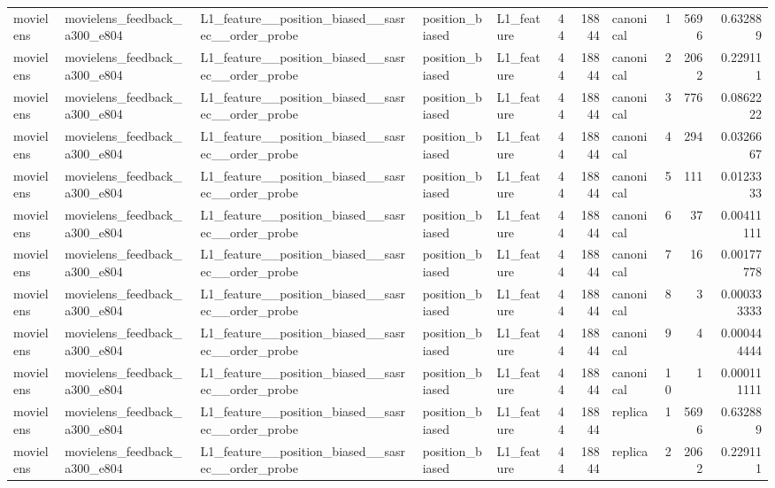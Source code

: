 \begin{table}[htbp!]
\begin{tabular}{lllllrrlrrr}
movielens & movielens\_feedback\_a300\_e804 & L1\_feature\_\_position\_biased\_\_sasrec\_\_order\_probe & position\_biased & L1\_feature & 44 & 18844 & canonical & 1 & 5696 & 0.632889 \\
movielens & movielens\_feedback\_a300\_e804 & L1\_feature\_\_position\_biased\_\_sasrec\_\_order\_probe & position\_biased & L1\_feature & 44 & 18844 & canonical & 2 & 2062 & 0.229111 \\
movielens & movielens\_feedback\_a300\_e804 & L1\_feature\_\_position\_biased\_\_sasrec\_\_order\_probe & position\_biased & L1\_feature & 44 & 18844 & canonical & 3 & 776 & 0.0862222 \\
movielens & movielens\_feedback\_a300\_e804 & L1\_feature\_\_position\_biased\_\_sasrec\_\_order\_probe & position\_biased & L1\_feature & 44 & 18844 & canonical & 4 & 294 & 0.0326667 \\
movielens & movielens\_feedback\_a300\_e804 & L1\_feature\_\_position\_biased\_\_sasrec\_\_order\_probe & position\_biased & L1\_feature & 44 & 18844 & canonical & 5 & 111 & 0.0123333 \\
movielens & movielens\_feedback\_a300\_e804 & L1\_feature\_\_position\_biased\_\_sasrec\_\_order\_probe & position\_biased & L1\_feature & 44 & 18844 & canonical & 6 & 37 & 0.00411111 \\
movielens & movielens\_feedback\_a300\_e804 & L1\_feature\_\_position\_biased\_\_sasrec\_\_order\_probe & position\_biased & L1\_feature & 44 & 18844 & canonical & 7 & 16 & 0.00177778 \\
movielens & movielens\_feedback\_a300\_e804 & L1\_feature\_\_position\_biased\_\_sasrec\_\_order\_probe & position\_biased & L1\_feature & 44 & 18844 & canonical & 8 & 3 & 0.000333333 \\
movielens & movielens\_feedback\_a300\_e804 & L1\_feature\_\_position\_biased\_\_sasrec\_\_order\_probe & position\_biased & L1\_feature & 44 & 18844 & canonical & 9 & 4 & 0.000444444 \\
movielens & movielens\_feedback\_a300\_e804 & L1\_feature\_\_position\_biased\_\_sasrec\_\_order\_probe & position\_biased & L1\_feature & 44 & 18844 & canonical & 10 & 1 & 0.000111111 \\
movielens & movielens\_feedback\_a300\_e804 & L1\_feature\_\_position\_biased\_\_sasrec\_\_order\_probe & position\_biased & L1\_feature & 44 & 18844 & replica & 1 & 5696 & 0.632889 \\
movielens & movielens\_feedback\_a300\_e804 & L1\_feature\_\_position\_biased\_\_sasrec\_\_order\_probe & position\_biased & L1\_feature & 44 & 18844 & replica & 2 & 2062 & 0.229111 \\

\end{tabular}
\end{table}
